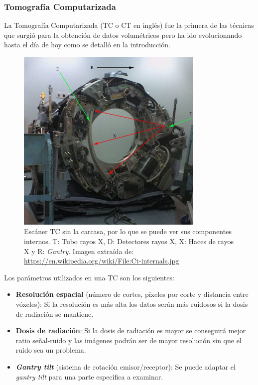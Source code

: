 \subsubsection{Tomografía Computarizada}

La Tomografía Computarizada (TC o CT en inglés) fue la primera de las técnicas que surgió para la obtención de datos volumétricos pero ha ido evolucionando hasta el día de hoy como se detalló en la introducción.

\begin{figure}[H]
	\centering
	\includegraphics[width=9cm]{imagenes/desarrollo/tc}
	\caption{Escáner TC sin la carcasa, por lo que se puede ver sus componentes internos. T: Tubo rayos X, D: Detectores rayos X, X: Haces de rayos X y R: \textit{Gantry}. Imagen extraída de: \url{https://en.wikipedia.org/wiki/File:Ct-internals.jpg}}
	\label{fig:desarrollo/tc}
\end{figure}

Los parámetros utilizados en una TC son los siguientes:

\begin{itemize}
	\item \textbf{Resolución espacial} (número de cortes, píxeles por corte y distancia entre vóxeles): Si la resolución es más alta los datos serán más ruidosos si la dosis de radiación se mantiene.
	\item \textbf{Dosis de radiación}: Si la dosis de radiación es mayor se conseguirá mejor ratio señal-ruido y las imágenes podrán ser de mayor resolución sin que el ruido sea un problema.
	\item \textbf{\textit{Gantry tilt}} (sistema de rotación emisor/receptor): Se puede adaptar el \textit{gantry tilt} para una parte específica a examinar.
\end{itemize}

